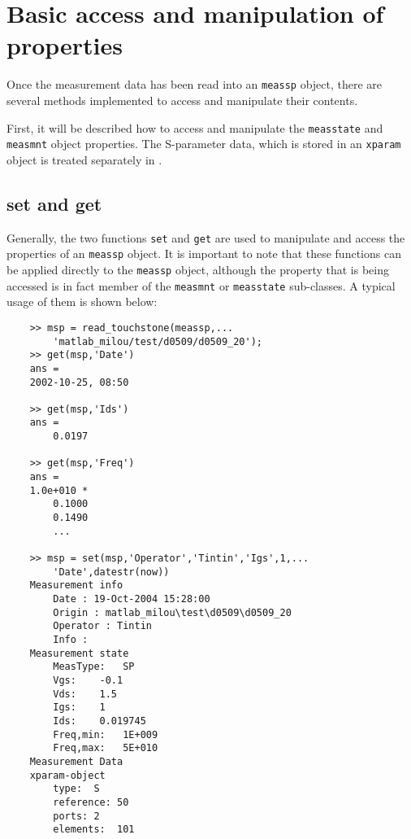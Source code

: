 %
\section{Basic access and manipulation of properties}\label{sec:DACManip}
Once the measurement data has been read into an \verb"meassp"
object, there are several methods implemented to access and
manipulate their contents.

First, it will be described how to access and manipulate the
\verb"measstate" and \verb"measmnt" object properties. The
S-parameter data, which is stored in an \verb"xparam" object is
treated separately in .

\subsection{set and get}
Generally, the two functions \verb"set" and \verb"get" are used to
manipulate and access the properties of an \verb"meassp" object.
It is important to note that these functions can be applied
directly to the \verb"meassp" object, although the property that
is being accessed is in fact member of the \verb"measmnt" or
\verb"measstate" sub-classes. A typical usage of them is shown
below:

\begin{small}
\begin{verbatim}
    >> msp = read_touchstone(meassp,...
        'matlab_milou/test/d0509/d0509_20');
    >> get(msp,'Date')
    ans =
    2002-10-25, 08:50

    >> get(msp,'Ids')
    ans =
        0.0197

    >> get(msp,'Freq')
    ans =
    1.0e+010 *
        0.1000
        0.1490
        ...

    >> msp = set(msp,'Operator','Tintin','Igs',1,...
        'Date',datestr(now))
    Measurement info
        Date : 19-Oct-2004 15:28:00
        Origin : matlab_milou\test\d0509\d0509_20
        Operator : Tintin
        Info :
    Measurement state
        MeasType:   SP
        Vgs:    -0.1
        Vds:    1.5
        Igs:    1
        Ids:    0.019745
        Freq,min:   1E+009
        Freq,max:   5E+010
    Measurement Data
    xparam-object
        type:  S
        reference: 50
        ports: 2
        elements:  101
\end{verbatim}
\end{small}


